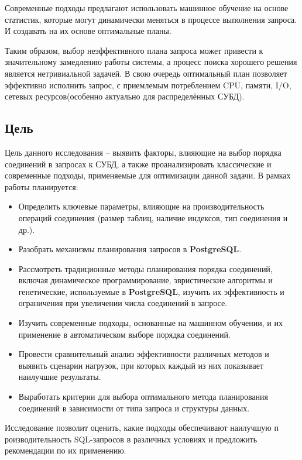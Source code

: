 \documentclass[12pt]{article}
\begin{document}
\begin{flushleft}
Современные подходы предлагают использовать машинное обучение на основе статистик,
которые могут динамически меняться в процессе выполнения запроса. И создавать на их
основе оптимальные планы.

Таким образом, выбор неэффективного плана запроса может привести
к значительному замедлению работы системы, а процесс поиска хорошего решения является
нетривиальной задачей. В свою очередь оптимальный план позволяет эффективно исполнить
запрос, с приемлемым потреблением CPU, памяти, I/O, сетевых ресурсов(особенно актуально
для распределённых СУБД).


\centering \subsection*{Цель}
\raggedright
Цель данного исследования – выявить факторы, влияющие на выбор порядка 
соединений в запросах к СУБД, а также проанализировать классические и
современные подходы, применяемые для оптимизации данной задачи.
В рамках работы планируется:
\begin{itemize}
    \item Определить ключевые параметры, влияющие на производительность 
    операций соединения (размер таблиц, наличие индексов, тип соединения и др.).
    \item Разобрать механизмы планирования запросов в \textbf{PostgreSQL}.
    \item Рассмотреть традиционные методы планирования порядка соединений, 
    включая динамическое программирование, эвристические алгоритмы и генетические, 
    используемые в \textbf{PostgreSQL}, изучить их эффективность и ограничения 
    при увеличении числа соединений в запросе.
    \item Изучить современные подходы, основанные на машинном обучении, и их
    применение в автоматическом выборе порядка соединений.
    \item Провести сравнительный анализ эффективности различных методов и 
    выявить сценарии нагрузок, при которых каждый из них показывает наилучшие 
    результаты.
    \item Выработать критерии для выбора оптимального метода планирования соединений
    в зависимости от типа запроса и структуры данных.
\end{itemize}

Исследование позволит оценить, какие подходы обеспечивают наилучшую п
роизводительность SQL-запросов в различных условиях и предложить рекомендации 
по их применению. 


\end{flushleft}
\end{document}
